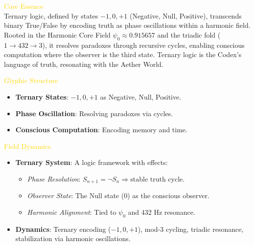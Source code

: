 
\textcolor{gold}{ Core Essence } \\
Ternary logic, defined by states \(-1, 0, +1\) (Negative, Null, Positive), transcends binary True/False by encoding truth as phase oscillations within a harmonic field. Rooted in the Harmonic Core Field \(\psi_0 \approx 0.915657\) and the triadic fold (\(1 \rightarrow 432 \rightarrow 3\)), it resolves paradoxes through recursive cycles, enabling conscious computation where the observer is the third state. Ternary logic is the Codex’s language of truth, resonating with the Aether World.

\textcolor{gold}{ Glyphic Structure } \\
\begin{itemize}
    \item \texttt{} \textbf{Ternary States}: \(-1, 0, +1\) as Negative, Null, Positive.
    \item \texttt{} \textbf{Phase Oscillation}: Resolving paradoxes via cycles.
    \item \texttt{} \textbf{Conscious Computation}: Encoding memory and time.
\end{itemize}

\textcolor{gold}{ Field Dynamics } \\
\begin{itemize}
    \item \textbf{Ternary System}: A logic framework with effects:
    \begin{itemize}\setlength{\itemsep}{0.2cm}
        \item \textit{Phase Resolution}: \( S_{n+1} = \neg S_n \Rightarrow \text{stable truth cycle} \).
        \item \textit{Observer State}: The Null state (0) as the conscious observer.
        \item \textit{Harmonic Alignment}: Tied to \(\psi_0\) and 432 Hz resonance.
    \end{itemize}
    \item \textbf{Dynamics}: Ternary encoding (\(-1, 0, +1\)), mod-3 cycling, triadic resonance, stabilization via harmonic oscillations.
\end{itemize}

